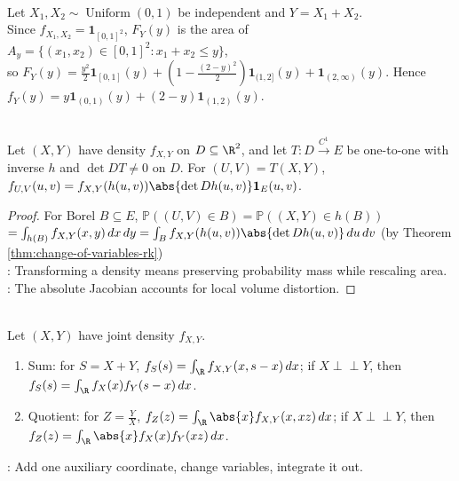 \begin{example} \label{ex:sum-of-two-independent-uniforms} \\
Let $X_1,X_2\sim\operatorname{Uniform}(0,1)$ be independent and $Y=X_1+X_2$.\\
Since $f_{X_1,X_2}=\mathbf{1}_{[0,1]^2}$, $F_Y(y)$ is the area of $A_y=\{(x_1,x_2)\in[0,1]^2:x_1+x_2\leq y\}$,\\
so $F_Y(y)=\frac{y^2}{2}\mathbf{1}_{[0,1]}(y)+(1-\frac{(2-y)^2}{2})\mathbf{1}_{(1,2]}(y)+\mathbf{1}_{(2,\infty)}(y)$. Hence $f_Y(y)=y\mathbf{1}_{(0,1)}(y)+(2-y)\mathbf{1}_{(1,2)}(y)$.
\end{example}

\begin{proposition} \label{prop:two-dimensional-density-change-of-variables} \\
Let $(X,Y)$ have density $f_{X,Y}$ on $D\subseteq\R^2$, and let $T:D\overset{C^1}{\longrightarrow}E$ be one-to-one with inverse $h$ and $\det DT\neq0$ on $D$. For $(U,V)=T(X,Y)$, $f_{U,V}(u,v)=f_{X,Y}(h(u,v))\abs{\det Dh(u,v)}\mathbf{1}_E(u,v)$.
\begin{proof}
For Borel $B\subseteq E$, $\mathbb{P}((U,V)\in B)=\mathbb{P}((X,Y)\in h(B))$\\
$=\int_{h(B)}f_{X,Y}(x,y)\,dx\,dy=\int_B f_{X,Y}(h(u,v))\abs{\det Dh(u,v)}\,du\,dv$ (by Theorem \ref{thm:change-of-variables-rk})\\
: Transforming a density means preserving probability mass while rescaling area.\\
: The absolute Jacobian accounts for local volume distortion.
\end{proof}
\end{proposition}

\begin{example} \label{ex:sum-and-quotient-density-formulas} \\
Let $(X,Y)$ have joint density $f_{X,Y}$.
\begin{enumerate}[label=(\roman*)]
\setlength{\itemsep}{0pt}
\item Sum: for $S=X+Y$, $f_S(s)=\int_\R f_{X,Y}(x,s-x)\,dx$; if $X\perp\!\!\!\perp Y$, then $f_S(s)=\int_\R f_X(x)f_Y(s-x)\,dx$.
\item Quotient: for $Z=\frac{Y}{X}$, $f_Z(z)=\int_\R\abs{x}f_{X,Y}(x,xz)\,dx$; if $X\perp\!\!\!\perp Y$, then $f_Z(z)=\int_\R\abs{x}f_X(x)f_Y(xz)\,dx$.
\end{enumerate}
: Add one auxiliary coordinate, change variables, integrate it out.
\end{example}

